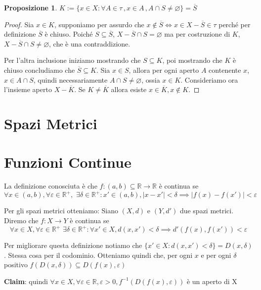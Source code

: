 \documentclass{article}
\newcounter{theo}[section]\setcounter{theo}{0}
\theoremstyle{plain}
\newtheorem{proposition}[theo]{Proposizione}
\theoremstyle{definition}
\theoremstyle{remark}
\begin{document}
\begin{proposition}
    \(K := \{x \in X : \forall A \in \tau\,,x \in A\,, A \cap S \neq \varnothing\}
    = \overline{S}\) 
\end{proposition}
\begin{proof}
    Sia \(x \in  K\), supponiamo per assurdo che \(x \not\in \overline{S} \iff x \in
X - \overline{S} \in \tau\) perché per definizione \(\overline{S}\) è chiuso.
Poiché \(S \subseteq \overline{S}\),  \(X - \overline{S} \cap S = \varnothing\) ma per
costruzione di \(K\),  \(X - \overline{S} \cap  S \neq \varnothing\), che è una
contraddizione.

    Per l'altra inclusione iniziamo mostrando che \(S \subseteq  K\), poi mostrando che
    \(K\) è chiuso concludiamo che \(\overline{S} \subseteq  K\). Sia \(x \in
    S\), allora per ogni aperto \(A\) contenente \(x\), \(x \in A \cap  S\),
    quindi necessariamente \(A \cap  S \neq \varnothing\), ossia \(x \in K\).
    Consideriamo ora l'insieme aperto \(X - \overline{K}\). Se \(K \neq
    \overline{K}\) allora esiste \(x \in \overline{K}, x \not\in K\).
\end{proof}
\section{Spazi Metrici}

\section{Funzioni Continue}
La definizione conosciuta è che \(f: (a, b) \subseteq \mathbb{R} \to  \mathbb{R}\) è continua se
\[\forall x \in (a, b), \forall \varepsilon \in  \mathbb{R}^{+},\,\, \exists \delta
    \in  \mathbb{R}^{+}: x' \in  (a, b), |x - x'| < \delta \implies  |f(x) - f(x')| <
\varepsilon\]

Per gli spazi metrici otteniamo:
Siano \((X, d)\) e \((Y, d')\) due spazi metrici. Diremo che \(f: X \to  Y\)
è continua se \[\forall x \in  X, \forall \varepsilon \in \mathbb{R}^{+}\,\,
\exists \delta \in \mathbb{R}^{+}: \forall x' \in
X, d(x, x') < \delta \implies  d'(f(x), f(x')) < \varepsilon\]

Per migliorare questa definizione notiamo che \(\{x' \in  X : d(x, x') <
\delta\} = D(x, \delta)\). Stessa cosa per il codominio. Otteniamo quindi che,
per ogni \(x\)  e per ogni \(\delta\) positivo \(f(D(x, \delta)) \subseteq
D(f(x), \varepsilon)\) 

\textbf{Claim}: quindi \(\forall x \in X, \forall \varepsilon \in \mathbb{R},
\varepsilon > 0, f^{-1}(D(f(x), \varepsilon))\) è un aperto di X
\end{document}
